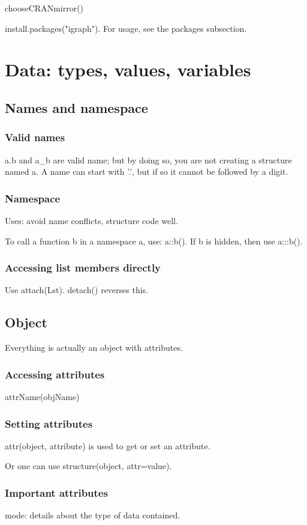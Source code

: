 chooseCRANmirror()

install.packages("igraph"). For usage, see the packages subsection.

\section{Data: types, values, variables}
\subsection{Names and namespace}
\subsubsection{Valid names}
a.b and a\_b are valid name; but by doing so, you are not creating a structure named a. A name can start with '.', but if so it cannot be followed by a digit.

\subsubsection{Namespace}
Uses: avoid name conflicts, structure code well.

To call a function b in a namespace a, use: a::b(). If b is hidden, then use a:::b().

\subsubsection{Accessing list members directly}
Use attach(Lst). detach() reverses this.

\subsection{Object}
Everything is actually an object with attributes.

\subsubsection{Accessing attributes}
attrName(objName)

\subsubsection{Setting attributes}
attr(object, attribute) is used to get or set an attribute.

Or one can use structure(object, attr=value).

\subsubsection{Important attributes}
mode: details about the type of data contained.

